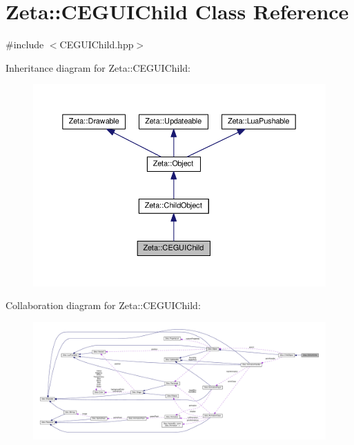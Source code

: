 \hypertarget{classZeta_1_1CEGUIChild}{\section{Zeta\+:\+:C\+E\+G\+U\+I\+Child Class Reference}
\label{classZeta_1_1CEGUIChild}
}


{\ttfamily \#include $<$C\+E\+G\+U\+I\+Child.\+hpp$>$}



Inheritance diagram for Zeta\+:\+:C\+E\+G\+U\+I\+Child\+:\nopagebreak
\begin{figure}[H]
\begin{center}
\leavevmode
\includegraphics[width=350pt]{classZeta_1_1CEGUIChild__inherit__graph}
\end{center}
\end{figure}


Collaboration diagram for Zeta\+:\+:C\+E\+G\+U\+I\+Child\+:
\nopagebreak
\begin{figure}[H]
\begin{center}
\leavevmode
\includegraphics[width=350pt]{classZeta_1_1CEGUIChild__coll__graph}
\end{center}
\end{figure}
